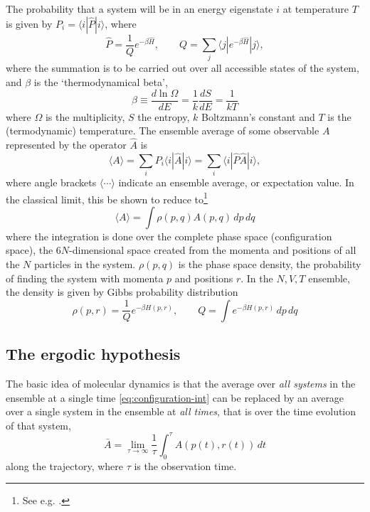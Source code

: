 \documentclass[11pt,bibliography=totoc,index=totoc]{scrbook}   %
\begin{document}
The probability that a system will be in an energy eigenstate $i$ at temperature $T$ is 
given by $P_i=\langle i | \hat{P} | i \rangle$, where
\begin{equation}
  \hat{P} = \frac{1}{Q} e^{-\beta\hat{H}}, \qquad Q = \sum_j \langle j | e^{-\beta\hat{H}} | j \rangle,
\end{equation}
where the summation is to be carried out over all accessible states of the system, and
$\beta$ is the `thermodynamical beta',
\begin{equation}
  \beta \equiv \frac{d\ln\Omega}{dE} = \frac{1}{k}\frac{dS}{dE} = \frac{1}{kT}
\end{equation}
where $\Omega$ is the multiplicity, $S$ the entropy, $k$ Boltzmann's constant and $T$ is the (termodynamic) temperature. 
The ensemble average of some observable $A$ represented by the operator $\hat{A}$ is
\begin{equation}
  \langle A \rangle = \sum_i P_i \langle i | \hat{A} | i\rangle = \sum_i \langle i | \hat{P} \hat{A} | i \rangle,
\end{equation}
where angle brackets $\langle \cdots \rangle$ indicate an ensemble average, or expectation value.
In the classical limit, this be shown to reduce to\footnote{See e.g. \cite[13-15]{Frenkel:1996}.}
\begin{equation}
  \langle A \rangle = \int \rho(p,q) A(p,q)\,dp\,dq 
  \label{eq:configuration-int}
\end{equation}
where the integration is done over the complete phase space (configuration space), the $6N$-dimensional space created from the momenta and positions of all the $N$ particles in the system. $\rho(p,q)$ is the phase space density, the probability of finding the system with momenta $p$ and positions $r$. In the $N,V,T$ ensemble, the density is given by Gibbs probability distribution
\begin{equation}
  \rho(p,r) = \frac{1}{Q} e^{-\beta H(p,r)},\qquad Q = \int e^{-\beta H(p,r)} \,dp\,dq
\end{equation}

\subsection{The ergodic hypothesis}

The basic idea of molecular dynamics is that the average over \emph{all systems} in the ensemble at a single time \eqref{eq:configuration-int} can be replaced by an average over a single system in the ensemble at \emph{all times}, that is over the time evolution of that system,
\begin{equation}
  \bar{A} = \lim_{\tau\to\infty} \frac{1}{\tau}\int_{0}^{\tau} A(p(t),r(t)) \,dt
  \label{eq:time-integral}
\end{equation}
along the trajectory, where $\tau$ is the observation time. 
\end{document}
